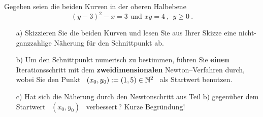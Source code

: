 {
Gegeben seien die beiden Kurven in der oberen Halbebene
\[
	(y-3)^2-x=3 \text{ und } xy=4\ ,\ \ y\ge 0\ .
\]
\begin{itemize}
\item[a)] Skizzieren Sie die beiden Kurven und lesen Sie aus Ihrer Skizze eine 
nicht-ganzzahlige Näherung für den Schnittpunkt ab.
\item[b)] Um den Schnittpunkt numerisch zu bestimmen, f\"uhren Sie \textbf{einen} 
Iterationsschritt mit dem \textbf{zweidimensionalen} Newton--Verfahren durch, 
wobei Sie den Punkt \ $(x_0,y_0):=(1,5)\in\mathbb{N}^2$ \  als Startwert benutzen.
\item[c)] Hat sich die Näherung durch den Newtonschritt aus Teil b) gegen\"uber 
dem Startwert \ $(x_0,y_0)$ \ verbessert\,? Kurze Begründung!
\end{itemize}
}
